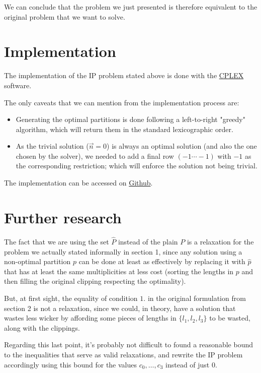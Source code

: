 \documentclass[12pt, letterpaper]{article}
\begin{document}
We can conclude that the problem we just presented is therefore equivalent to the original problem that we want to solve.

\section{Implementation}

The implementation of the IP problem stated above is done with the \href{https://www.ibm.com/analytics/cplex-optimizer}{CPLEX} software. 

The only caveats that we can mention from the implementation process are:
\begin{itemize}
    \item Generating the optimal partitions is done following a left-to-right "greedy" algorithm, which will return them in the standard lexicographic order.
    \item As the trivial solution ($\vec{n} = 0$) is always an optimal solution (and also the one chosen by the solver), we needed to add a final row $(-1 \cdots -1)$ with $-1$ as the corresponding restriction; which will enforce the solution not being trivial.
\end{itemize}

The implementation can be accessed on \href{https://github.com/damif94/wicker_rod_problem}{Github}.

\section{Further research}
The fact that we are using the set $\hat{P}$ instead of the plain $P$ is a relaxation for the problem we actually stated informally in section 1, since any solution using a non-optimal partition $p$ can be done at least as effectively by replacing it with $\hat{p}$ that has at least the same multiplicities at less cost (sorting the lengths in $p$ and then filling the original clipping respecting the optimality).
\par
\vspace{10px}
But, at first sight, the equality of condition $1.$ in the original formulation from section 2 is not a relaxation, since we could, in theory, have a solution that wastes less wicker by affording some pieces of lengths in $\{l_1, l_2, l_3\}$ to be wasted, along with the clippings.
\par
\vspace{10px}
Regarding this last point, it's probably not difficult to found a reasonable bound to the inequalities that serve as valid relaxations, and rewrite the IP problem accordingly using this bound for the values $c_0, \dots, c_3$ instead of just 0.
\end{document}
